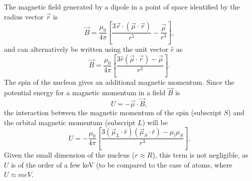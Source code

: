 The magnetic field generated by a dipole in a point of space identified by the radius vector \(\Vec{r}\) is
\begin{equation*}
    \Vec{B} = \frac{\mu_0}{4\pi}\left[\frac{3\Vec{r}\cdot(\Vec{\mu}\cdot\Vec{r})}{r^5} - \frac{\Vec{\mu}}{r^3}\right],
\end{equation*}
and can alternatively be written using the unit vector $\hat{r}$ as
\begin{equation*}
    \Vec{B} = \frac{\mu_0}{4\pi}\left[\frac{3\hat{r}(\Vec{\mu}\cdot\Vec{r})-\Vec{\mu}}{r^3}\right].
\end{equation*}
The spin of the nucleon gives an additional magnetic momentum. Since the potential energy for a magnetic momentum in a field $\Vec{B}$ is 
\begin{equation*}
    U = -\Vec{\mu}\cdot\Vec{B},
\end{equation*}
the interaction between the magnetic momentum of the spin (subscript \(S\)) and the orbital magnetic momentum (subscript \(L\)) will be
\begin{equation*}
    U = -\frac{\mu_0}{4\pi}\left[\frac{3(\Vec{\mu}_L\cdot\hat{r})(\Vec{\mu}_S\cdot\hat{r}) - \mu_l\mu_S}{r^3}\right].
\end{equation*}
Given the small dimension of the nucleus (\(r\approx R\)), this term is not negligible, as $U$ is of the order of a few \si{keV} (to be compared to the case of atoms, where \(U\approx\si{meV}\).

